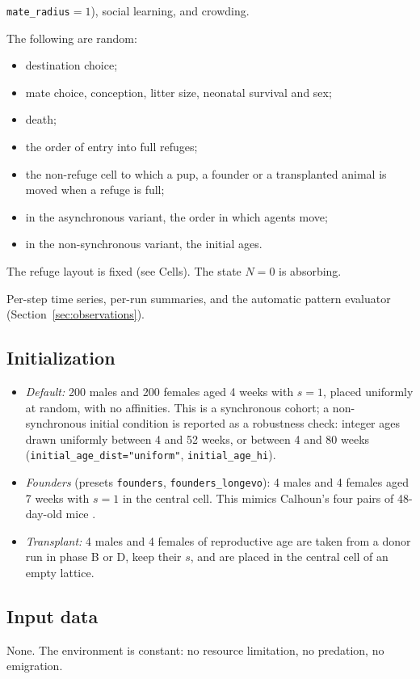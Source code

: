 \begin{description}
  \texttt{mate\_radius}${}=1$), social learning, and crowding.
\item[Stochasticity.] The following are random:
  \begin{itemize}
  \item destination choice;
  \item mate choice, conception, litter size, neonatal survival and sex;
  \item death;
  \item the order of entry into full refuges;
  \item the non-refuge cell to which a pup, a founder or a transplanted animal is moved when a refuge is full;
  \item in the asynchronous variant, the order in which agents move;
  \item in the non-synchronous variant, the initial ages.
  \end{itemize}
  The refuge layout is fixed (see Cells).
  The state $N=0$ is absorbing.
\item[Observation.] Per-step time series, per-run summaries, and the automatic pattern evaluator
  (Section~\ref{sec:observations}).
\end{description}

\subsection{Initialization}
\begin{itemize}
\item \emph{Default:} 200 males and 200 females aged 4 weeks with $s=1$, placed uniformly at random, with no
  affinities. This is a synchronous cohort; a non-synchronous initial condition is reported as a robustness
  check: integer ages drawn uniformly between 4 and 52 weeks, or between 4 and 80 weeks
  (\texttt{initial\_age\_dist="uniform"}, \texttt{initial\_age\_hi}).
\item \emph{Founders} (presets \texttt{founders}, \texttt{founders\_longevo}): 4 males and 4 females aged 7 weeks with
  $s=1$ in the central cell. This mimics Calhoun's four pairs of 48-day-old mice \cite{Calhoun1973}.
\item \emph{Transplant:} 4 males and 4 females of reproductive age are taken from a donor run in phase B or D, keep
  their $s$, and are placed in the central cell of an empty lattice.
\end{itemize}

\subsection{Input data}
None. The environment is constant: no resource limitation, no predation, no emigration.

